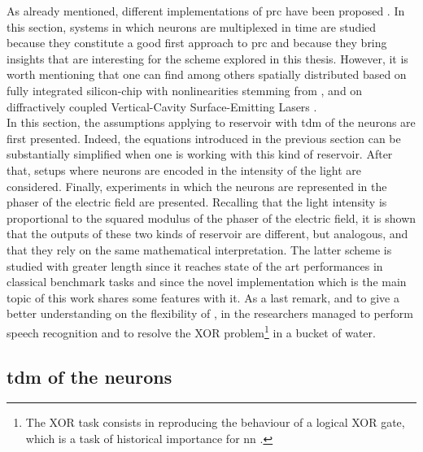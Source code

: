 \label{prc}

As already mentioned, different implementations of \gls{prc} have been proposed \cite{VanderSande2017}. In this section, systems in which neurons are multiplexed in time are studied because they constitute a good first approach to \gls{prc} and because they bring insights that are interesting for the scheme explored in this thesis. However, it is worth mentioning that one can find among others spatially distributed \rcer based on fully integrated silicon-chip with nonlinearities stemming from  \cite{Vandoorne2014}, and on diffractively coupled Vertical-Cavity Surface-Emitting Lasers \cite{Brunner2015}. \\

In this section, the assumptions applying to reservoir with \gls{tdm} of the neurons are first presented. Indeed, the equations introduced in the previous section can be substantially simplified when one is working with this kind of reservoir. After that, setups where neurons are encoded in the intensity of the light are considered. Finally, experiments in which the neurons are represented in the phaser of the electric field are presented. Recalling that the light intensity is proportional to the squared modulus of the phaser of the electric field, it is shown that the outputs of these two kinds of reservoir are different, but analogous, and that they rely on the same mathematical interpretation. The latter scheme is studied with greater length since it reaches state of the art performances in classical benchmark tasks and since the novel implementation which is the main topic of this work shares some features with it. As a last remark, and to give a better understanding on the flexibility of \rcer, in \cite{Fernando2003} the researchers managed to perform speech recognition and to resolve the XOR problem\footnote{The XOR task consists in reproducing the behaviour of a logical XOR gate, which is a task of historical importance for \gls{nn} \cite{minsky1969perceptrons}.} in a bucket of water.\\


\subsection{\acrlong{tdm} of the neurons}

\label{tdm-neurons}

